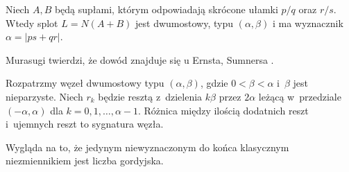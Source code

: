 \begin{proposition}
    Niech $A, B$ będą supłami, którym odpowiadają skrócone ułamki $p/q$ oraz $r/s$.
    Wtedy splot $L = N(A+B)$ jest dwumostowy, typu $(\alpha, \beta)$ i ma wyznacznik $\alpha = |ps + qr|$.
\end{proposition}

Murasugi \cite[twierdzenie 9.3.5]{murasugi1996} twierdzi, że dowód znajduje się u Ernsta, Sumnersa \cite[lemat 2.1]{ernst1990}.
%
%

\begin{proposition}
    Rozpatrzmy węzeł dwumostowy typu $(\alpha, \beta)$, gdzie $0 < \beta < \alpha$ i~$\beta$ jest nieparzyste.
    Niech $r_k$ będzie resztą z~dzielenia $k\beta$ przez $2\alpha$ leżącą w~przedziale $(-\alpha, \alpha)$ dla $k = 0, 1, \ldots, \alpha - 1$.
    Różnica między ilością dodatnich reszt i~ujemnych reszt to sygnatura węzła.
\end{proposition}

Wygląda na to, że jedynym niewyznaczonym do końca klasycznym niezmiennikiem jest liczba gordyjska.

%


